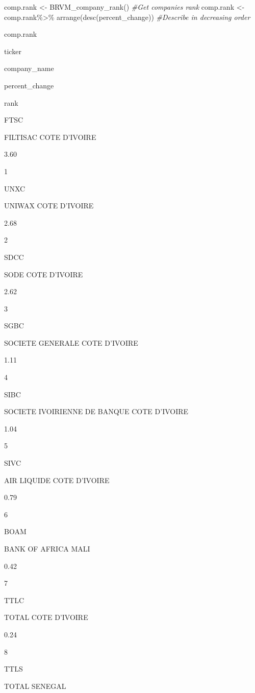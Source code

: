 \documentclass[
]{article}
\newenvironment{Shaded}{\begin{snugshade}}{\end{snugshade}}
\newcommand{\CommentTok}[1]{\textcolor[rgb]{0.56,0.35,0.01}{\textit{#1}}}
\newcommand{\FunctionTok}[1]{\textcolor[rgb]{0.00,0.00,0.00}{#1}}
\newcommand{\NormalTok}[1]{#1}
\newcommand{\OtherTok}[1]{\textcolor[rgb]{0.56,0.35,0.01}{#1}}
\newcommand{\SpecialCharTok}[1]{\textcolor[rgb]{0.00,0.00,0.00}{#1}}
\begin{document}
\begin{Shaded}
\begin{Highlighting}[]
\NormalTok{comp.rank }\OtherTok{\textless{}{-}} \FunctionTok{BRVM\_company\_rank}\NormalTok{() }\CommentTok{\#Get companies rank}
\NormalTok{comp.rank }\OtherTok{\textless{}{-}}\NormalTok{ comp.rank}\SpecialCharTok{\%\textgreater{}\%}
    \FunctionTok{arrange}\NormalTok{(}\FunctionTok{desc}\NormalTok{(percent\_change)) }\CommentTok{\#Describe in decreasing order}

\NormalTok{comp.rank}
\end{Highlighting}
\end{Shaded}

ticker

company\_name

percent\_change

rank

FTSC

FILTISAC COTE D'IVOIRE

3.60

1

UNXC

UNIWAX COTE D'IVOIRE

2.68

2

SDCC

SODE COTE D'IVOIRE

2.62

3

SGBC

SOCIETE GENERALE COTE D'IVOIRE

1.11

4

SIBC

SOCIETE IVOIRIENNE DE BANQUE COTE D'IVOIRE

1.04

5

SIVC

AIR LIQUIDE COTE D'IVOIRE

0.79

6

BOAM

BANK OF AFRICA MALI

0.42

7

TTLC

TOTAL COTE D'IVOIRE

0.24

8

TTLS

TOTAL SENEGAL
\end{document}
